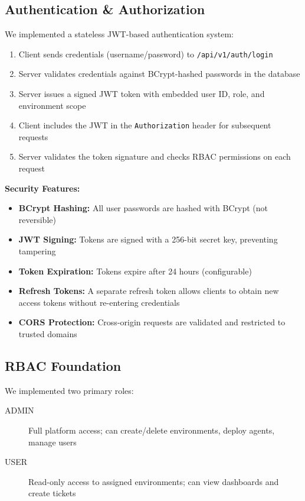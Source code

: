 \documentclass[12pt,a4paper]{report}
\begin{document}
\subsection{Authentication \& Authorization}

We implemented a stateless JWT-based authentication system:

\begin{enumerate}
  \item Client sends credentials (username/password) to \texttt{/api/v1/auth/login}
  \item Server validates credentials against BCrypt-hashed passwords in the database
  \item Server issues a signed JWT token with embedded user ID, role, and environment scope
  \item Client includes the JWT in the \texttt{Authorization} header for subsequent requests
  \item Server validates the token signature and checks RBAC permissions on each request
\end{enumerate}

\textbf{Security Features:}
\begin{itemize}
  \item \textbf{BCrypt Hashing:} All user passwords are hashed with BCrypt (not reversible)
  \item \textbf{JWT Signing:} Tokens are signed with a 256-bit secret key, preventing tampering
  \item \textbf{Token Expiration:} Tokens expire after 24 hours (configurable)
  \item \textbf{Refresh Tokens:} A separate refresh token allows clients to obtain new access tokens without re-entering credentials
  \item \textbf{CORS Protection:} Cross-origin requests are validated and restricted to trusted domains
\end{itemize}

\subsection{RBAC Foundation}

We implemented two primary roles:

\begin{description}
  \item[ADMIN] Full platform access; can create/delete environments, deploy agents, manage users
  \item[USER] Read-only access to assigned environments; can view dashboards and create tickets
\end{description}
\end{document}

